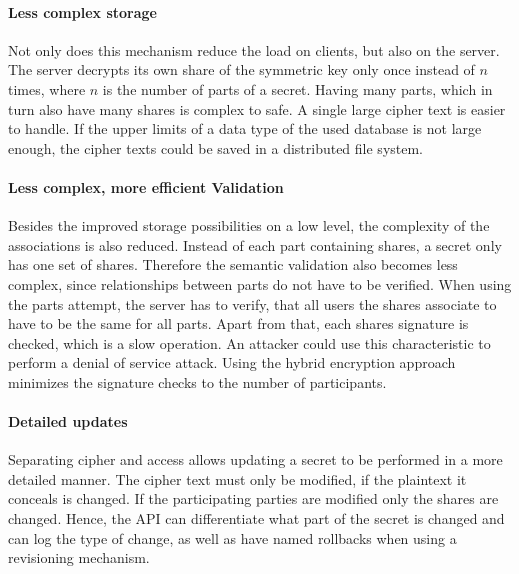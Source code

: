 \paragraph{Less complex storage}{ Not only does this mechanism reduce the load
  on clients, but also on the server. The server decrypts its own share of the
  symmetric key only once instead of $n$ times, where $n$ is the number of
  parts of a secret.  Having many parts, which in turn also have many shares is
complex to safe. A single large cipher text is easier to handle. If the upper
limits of a data type of the used database is not large enough, the cipher
texts could be saved in a distributed file system.}

\paragraph{Less complex, more efficient Validation}{ Besides the improved
  storage possibilities on a low level, the complexity of the associations is
  also reduced. Instead of each part containing shares, a secret only has one
  set of shares.  Therefore the semantic validation also becomes less complex,
  since relationships between parts do not have to be verified. When using the
  parts attempt, the server has to verify, that all users the shares associate
  to have to be the same for all parts. Apart from that, each shares signature
  is checked, which is a slow operation. An attacker could use this
characteristic to perform a denial of service attack. Using the hybrid
encryption approach minimizes the signature checks to the number of
participants. }

\paragraph{Detailed updates}{ Separating cipher and access allows updating a
  secret to be performed in a more detailed manner. The cipher text must only
  be modified, if the plaintext it conceals is changed. If the participating
  parties are modified only the shares are changed. Hence, the API can
differentiate what part of the secret is changed and can log the type of
change, as well as have named rollbacks when using a revisioning mechanism. }

